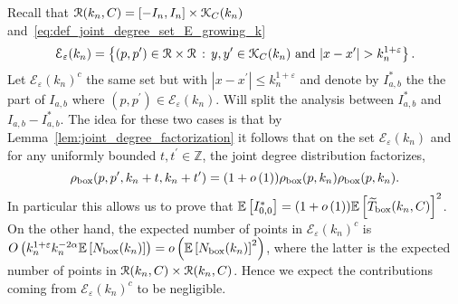 Recall that ${\mathcal R}(k_n,C) = [-I_n,I_n] \times {\mathcal K}_{C}(k_n)$ and~\eqref{eq:def_joint_degree_set_E_growing_k}
\[
	\mathcal{E}_{\varepsilon}(k_n) = \left\{(p,p^\prime) \in {\mathcal R} \times {\mathcal R}
			\, : \, y,y^\prime \in {\mathcal K}_{C}(k_n) \text{ and } |x - x^\prime| > k_n^{1 + \varepsilon} \right\}.
\]
Let $\mathcal{E}_\varepsilon(k_n)^c$ the same set but with $|x - x^\prime| \le k_n^{1 + \varepsilon}$ and denote by $I_{a,b}^\ast$ the the part of $I_{a,b}$ where $(p,p^\prime) \in \mathcal{E}_\varepsilon(k_n)$. Will split the analysis between $I_{a,b}^\ast$ and $I_{a,b} - I_{a,b}^\ast$. The idea for these two cases is that by Lemma~\ref{lem:joint_degree_factorization} it follows that on the set $\mathcal{E}_\varepsilon(k_n)$ and for any uniformly bounded $t, t^\prime \in \mathbb{Z}$, the joint degree distribution factorizes,
\[
	\rho_{\text{box}}(p,p^\prime,k_n + t,k_n+t^\prime) = (1 + o\left(1\right))\rho_{\text{box}}(p,k_n)\rho_{\text{box}}(p,k_n).
\]
In particular this allows us to prove that $\mathbb{E}\left[I_{0,0}^\ast\right] = (1+o\left(1\right))\mathbb{E}\left[\widetilde{T}_{\text{box}}(k_n,C)\right]^2$. 
On the other hand, the expected number of points in $\mathcal{E}_\varepsilon(k_n)^c$ is $O\left(k_n^{1+\varepsilon} k_n^{-2\alpha} \mathbb{E}\left[N_{\text{box}}(k_n)\right]\right) = o\left(\mathbb{E}\left[N_{\text{box}}(k_n)\right]^2\right)$, where the latter is the expected number of points in ${\mathcal R}(k_n,C) \times {\mathcal R}(k_n,C)$. Hence we expect the contributions coming from $\mathcal{E}_\varepsilon(k_n)^c$ to be negligible.



